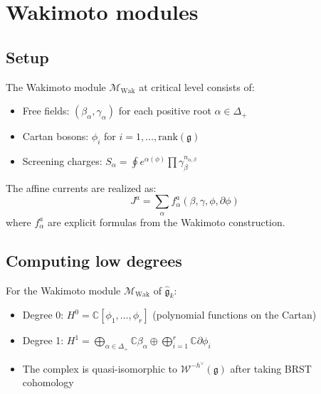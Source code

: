 \section{Wakimoto modules}

\subsection{Setup}
 
\begin{definition}
The Wakimoto module $\mathcal{M}_{\text{Wak}}$ at critical level consists of:
\begin{itemize}
\item Free fields: $(\beta_\alpha, \gamma_\alpha)$ for each positive root $\alpha \in \Delta_+$
\item Cartan bosons: $\phi_i$ for $i = 1, \ldots, \text{rank}(\mathfrak{g})$
\item Screening charges: $S_\alpha = \oint e^{\alpha(\phi)} \prod \gamma_\beta^{n_{\alpha,\beta}}$
\end{itemize}
The affine currents are realized as:
\[
J^a = \sum_{\alpha} f^a_\alpha(\beta, \gamma, \phi, \partial\phi)
\]
where $f^a_\alpha$ are explicit formulas from the Wakimoto construction.
\end{definition}
 
\subsection{Computing low degrees}
 
\begin{theorem}\label{thm:wakimoto-bar}
For the Wakimoto module $\mathcal{M}_{\mathrm{Wak}}$ of $\widehat{\mathfrak{g}}_k$:
\begin{itemize}
\item Degree 0: $H^0 = \mathbb{C}[\phi_1, \ldots, \phi_r]$ (polynomial functions on the Cartan)
\item Degree 1: $H^1 = \bigoplus_{\alpha \in \Delta_+} \mathbb{C}\beta_\alpha \oplus \bigoplus_{i=1}^r \mathbb{C}\partial\phi_i$
\item The complex is quasi-isomorphic to $\mathcal{W}^{-h^\vee}(\mathfrak{g})$ after taking BRST cohomology
\end{itemize}
\end{theorem}

